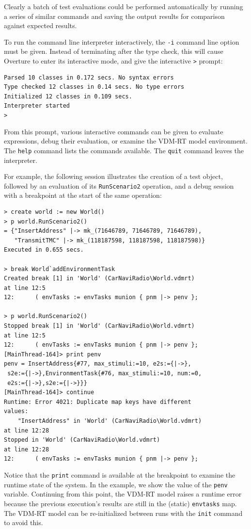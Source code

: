 Clearly a batch of test evaluations could be performed automatically by running
a series of similar commands and saving the output results for comparison
against expected results.

To run the command line interpreter interactively, the \verb|-i| command line
option must be given. Instead of terminating after the type check, this will
cause Overture to enter its interactive mode, and give the interactive \verb|>|
prompt:

\begin{lstlisting}
Parsed 10 classes in 0.172 secs. No syntax errors
Type checked 12 classes in 0.14 secs. No type errors
Initialized 12 classes in 0.109 secs.
Interpreter started
>
\end{lstlisting}

\noindent From this prompt, various interactive commands can be given to
evaluate expressions, debug their evaluation, or examine the VDM-RT model environment.
The \verb|help| command lists the commands available. The \verb|quit| command
leaves the interpreter.

For example, the following session illustrates the creation of a test object,
followed by an evaluation of its \verb|RunScenario2| operation, and a debug
session with a breakpoint at the start of the same operation:

\begin{lstlisting}
> create world := new World()
> p world.RunScenario2()
= {"InsertAddress" |-> mk_(71646789, 71646789, 71646789), 
   "TransmitTMC" |-> mk_(118187598, 118187598, 118187598)}
Executed in 0.655 secs.

> break World`addEnvironmentTask
Created break [1] in 'World' (CarNaviRadio\World.vdmrt) 
at line 12:5
12:      ( envTasks := envTasks munion { pnm |-> penv };

> p world.RunScenario2()
Stopped break [1] in 'World' (CarNaviRadio\World.vdmrt) 
at line 12:5
12:      ( envTasks := envTasks munion { pnm |-> penv };
[MainThread-164]> print penv
penv = InsertAddress{#77, max_stimuli:=10, e2s:={|->},
 s2e:={|->},EnvironmentTask{#76, max_stimuli:=10, num:=0,
 e2s:={|->},s2e:={|->}}}
[MainThread-164]> continue
Runtime: Error 4021: Duplicate map keys have different 
values:
    "InsertAddress" in 'World' (CarNaviRadio\World.vdmrt) 
at line 12:28
Stopped in 'World' (CarNaviRadio\World.vdmrt) 
at line 12:28
12:      ( envTasks := envTasks munion { pnm |-> penv };
\end{lstlisting}

\noindent Notice that the \verb|print| command is available at the breakpoint
to examine the runtime state of the system. In the example, we show the value
of the \verb|penv| variable. Continuing from this point, the VDM-RT model
raises a runtime error because the previous execution's results are still in
the (static) \verb|envtasks| map. The VDM-RT model can be re-initialized
between runs with the \verb|init| command to avoid this.


